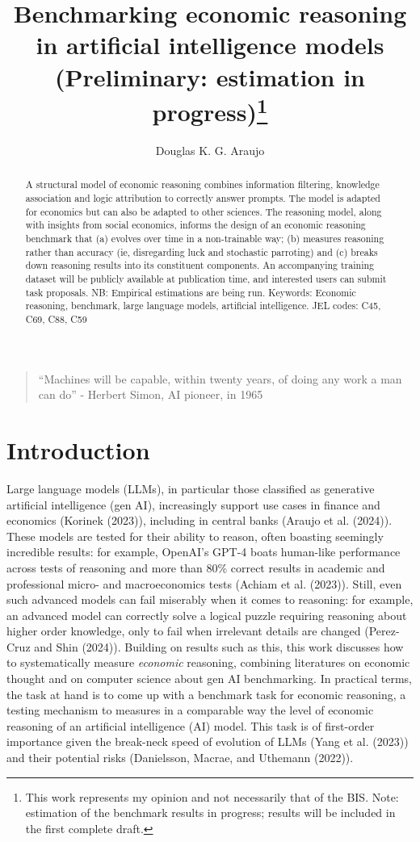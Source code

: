 \documentclass[
]{article}
\title{Benchmarking economic reasoning in artificial intelligence models
(Preliminary: estimation in progress)\thanks{This work represents my
opinion and not necessarily that of the BIS. Note: estimation of the
benchmark results in progress; results will be included in the first
complete draft.}}
\author{Douglas K. G. Araujo}
\affil{%
                  Bank for International
Settlements, douglas.araujo@bis.org
              }
\date{}
\begin{document}
\maketitle
\begin{abstract}
A structural model of economic reasoning combines information filtering,
knowledge association and logic attribution to correctly answer prompts.
The model is adapted for economics but can also be adapted to other
sciences. The reasoning model, along with insights from social
economics, informs the design of an economic reasoning benchmark that
(a) evolves over time in a non-trainable way; (b) measures reasoning
rather than accuracy (ie, disregarding luck and stochastic parroting)
and (c) breaks down reasoning results into its constituent components.
An accompanying training dataset will be publicly available at
publication time, and interested users can submit task proposals. NB:
Empirical estimations are being run. Keywords: Economic reasoning,
benchmark, large language models, artificial intelligence. JEL codes:
C45, C69, C88, C59
\end{abstract}

\begin{quote}
``Machines will be capable, within twenty years, of doing any work a man
can do'' - Herbert Simon, AI pioneer, in 1965
\end{quote}

\section{Introduction}\label{introduction}

Large language models (LLMs), in particular those classified as
generative artificial intelligence (gen AI), increasingly support use
cases in finance and economics (Korinek (2023)), including in central
banks (Araujo et al. (2024)). These models are tested for their ability
to reason, often boasting seemingly incredible results: for example,
OpenAI's GPT-4 boats human-like performance across tests of reasoning
and more than 80\% correct results in academic and professional micro-
and macroeconomics tests (Achiam et al. (2023)). Still, even such
advanced models can fail miserably when it comes to reasoning: for
example, an advanced model can correctly solve a logical puzzle
requiring reasoning about higher order knowledge, only to fail when
irrelevant details are changed (Perez-Cruz and Shin (2024)). Building on
results such as this, this work discusses how to systematically measure
\emph{economic} reasoning, combining literatures on economic thought and
on computer science about gen AI benchmarking. In practical terms, the
task at hand is to come up with a benchmark task for economic reasoning,
a testing mechanism to measures in a comparable way the level of
economic reasoning of an artificial intelligence (AI) model. This task
is of first-order importance given the break-neck speed of evolution of
LLMs (Yang et al. (2023)) and their potential risks (Danielsson, Macrae,
and Uthemann (2022)).
\end{document}

